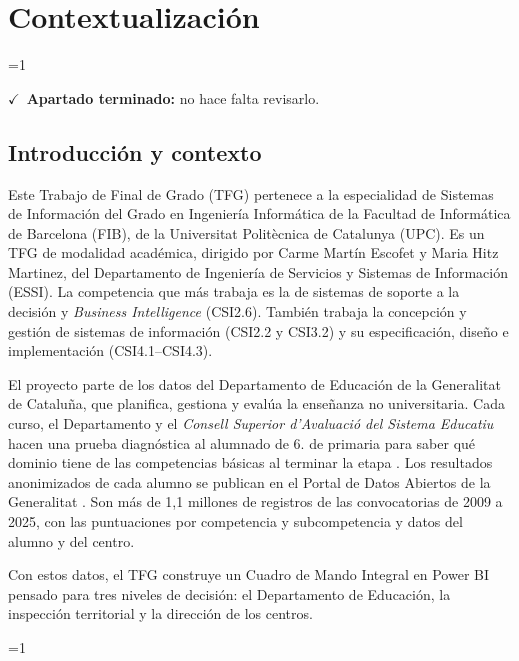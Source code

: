 \documentclass[12pt, a4paper, oneside]{report}
\newcommand{\mostrarterminados}{1}
\newenvironment{revisado}
  {\ifnum\mostrarterminados=1\relax\begin{cajarevisada}\noindent\colorbox{verdeterminado}{\parbox{\dimexpr\linewidth-2\fboxsep\relax}{\small$\checkmark$\ \textbf{Apartado terminado:} no hace falta revisarlo.}}\par\medskip\fi}
  {\ifnum\mostrarterminados=1\relax\end{cajarevisada}\fi}
\begin{document}
\chapter{Contextualización}
\begin{revisado}

\section{Introducción y contexto}
Este Trabajo de Final de Grado (TFG) pertenece a la especialidad de Sistemas de Información del Grado en Ingeniería Informática de la Facultad de Informática de Barcelona (FIB), de la Universitat Politècnica de Catalunya (UPC). Es un TFG de modalidad académica, dirigido por Carme Martín Escofet y Maria Hitz Martinez, del Departamento de Ingeniería de Servicios y Sistemas de Información (ESSI). La competencia que más trabaja es la de sistemas de soporte a la decisión y \textit{Business Intelligence} (CSI2.6). También trabaja la concepción y gestión de sistemas de información (CSI2.2 y CSI3.2) y su especificación, diseño e implementación (CSI4.1--CSI4.3).

El proyecto parte de los datos del Departamento de Educación de la Generalitat de Cataluña, que planifica, gestiona y evalúa la enseñanza no universitaria. Cada curso, el Departamento y el \textit{Consell Superior d'Avaluació del Sistema Educatiu} hacen una prueba diagnóstica al alumnado de 6.\textordmasculine{} de primaria para saber qué dominio tiene de las competencias básicas al terminar la etapa \cite{csase_resultats}. Los resultados anonimizados de cada alumno se publican en el Portal de Datos Abiertos de la Generalitat \cite{transparencia_catalunya_2024}. Son más de 1,1 millones de registros de las convocatorias de 2009 a 2025, con las puntuaciones por competencia y subcompetencia y datos del alumno y del centro.

Con estos datos, el TFG construye un Cuadro de Mando Integral en Power BI pensado para tres niveles de decisión: el Departamento de Educación, la inspección territorial y la dirección de los centros.


\end{revisado}
\end{document}
